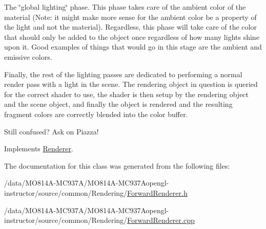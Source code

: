 \begin{DoxyEnumerate}
\item The \char`\"{}global lighting\char`\"{} phase. This phase takes care of the ambient color of the material (Note\+: it might make more sense for the ambient color be a property of the light and not the material). Regardless, this phase will take care of the color that should only be added to the object once regardless of how many lights shine upon it. Good examples of things that would go in this stage are the ambient and emissive colors.
\item Finally, the rest of the lighting passes are dedicated to performing a normal render pass with a light in the scene. The rendering object in question is queried for the correct shader to use, the shader is then setup by the rendering object and the scene object, and finally the object is rendered and the resulting fragment colors are correctly blended into the color buffer.
\end{DoxyEnumerate}

Still confused? Ask on Piazza!

Implements \hyperlink{class_renderer_a38623da22aa718cfa41e2514ebd269f5}{Renderer}.



The documentation for this class was generated from the following files\+:\begin{DoxyCompactItemize}
\item
/data/MO814A-MC937A/MO814A-MC937Aopengl-\/instructor/source/common/\+Rendering/\hyperlink{_forward_renderer_8h}{Forward\+Renderer.\+h}\item
/data/MO814A-MC937A/MO814A-MC937Aopengl-\/instructor/source/common/\+Rendering/\hyperlink{_forward_renderer_8cpp}{Forward\+Renderer.\+cpp}\end{DoxyCompactItemize}
